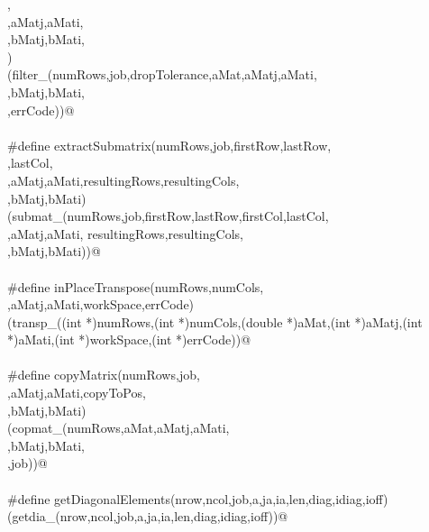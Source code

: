 \documentclass[12pt]{article}
\begin{document}
\begin{flushleft}
\begin{minipage}{\linewidth}
\begin{list}{}{}
\mbox{}\verb@spaceAllocated, \@\\
\mbox{}\verb@aMat,aMatj,aMati, \@\\
\mbox{}\verb@bMat,bMatj,bMati, \@\\
\mbox{}\verb@errCode) \@\\
\mbox{}\verb@(filter_(numRows,job,dropTolerance,aMat,aMatj,aMati, \@\\
\mbox{}\verb@bMat,bMatj,bMati, \@\\
\mbox{}\verb@spaceAllocated,errCode))@\\
\mbox{}\verb@@\\
\mbox{}\verb@#define extractSubmatrix(numRows,job,firstRow,lastRow, \@\\
\mbox{}\verb@firstCol,lastCol, \@\\
\mbox{}\verb@aMat,aMatj,aMati,resultingRows,resultingCols, \@\\
\mbox{}\verb@bMat,bMatj,bMati) \@\\
\mbox{}\verb@(submat_(numRows,job,firstRow,lastRow,firstCol,lastCol, \@\\
\mbox{}\verb@aMat,aMatj,aMati, resultingRows,resultingCols,\@\\
\mbox{}\verb@bMat,bMatj,bMati))@\\
\mbox{}\verb@@\\
\mbox{}\verb@#define inPlaceTranspose(numRows,numCols, \@\\
\mbox{}\verb@aMat,aMatj,aMati,workSpace,errCode) \@\\
\mbox{}\verb@(transp_((int *)numRows,(int *)numCols,(double *)aMat,(int *)aMatj,(int *)aMati,(int *)workSpace,(int *)errCode))@\\
\mbox{}\verb@@\\
\mbox{}\verb@#define copyMatrix(numRows,job, \@\\
\mbox{}\verb@aMat,aMatj,aMati,copyToPos, \@\\
\mbox{}\verb@bMat,bMatj,bMati) \@\\
\mbox{}\verb@(copmat_(numRows,aMat,aMatj,aMati, \@\\
\mbox{}\verb@bMat,bMatj,bMati,\@\\
\mbox{}\verb@copyToPos,job))@\\
\mbox{}\verb@@\\
\mbox{}\verb@#define getDiagonalElements(nrow,ncol,job,a,ja,ia,len,diag,idiag,ioff)\@\\
\mbox{}\verb@(getdia_(nrow,ncol,job,a,ja,ia,len,diag,idiag,ioff))@\\
\mbox{}\verb@@\\

\end{list}
\end{minipage}
\end{flushleft}
\end{document}
